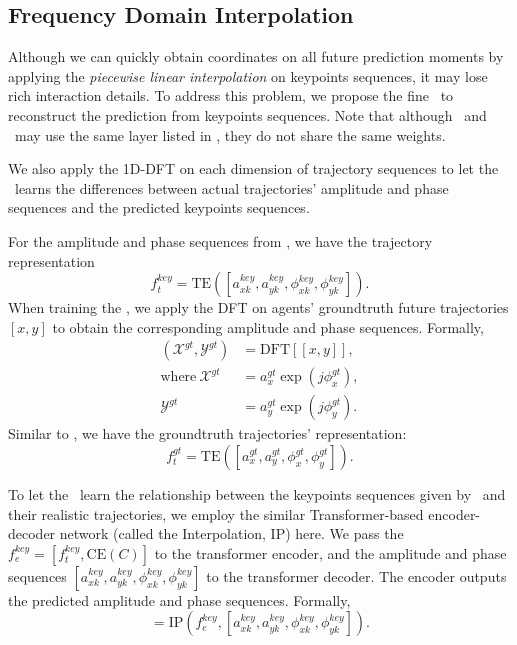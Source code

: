 \documentclass[../paper.tex]{subfiles}
\begin{document}
\subsection{Frequency Domain Interpolation}

Although we can quickly obtain coordinates on all future prediction moments by applying the \emph{piecewise linear interpolation} on keypoints sequences, it may lose rich interaction details.
To address this problem, we propose the fine \BETAMODEL~to reconstruct the prediction from keypoints sequences.
Note that although \ALPHAMODEL~and \BETAMODEL~may use the same layer listed in , they do not share the same weights.

We also apply the 1D-DFT on each dimension of trajectory sequences to let the \BETAMODEL~learns the differences between actual trajectories' amplitude and phase sequences and the predicted keypoints sequences.

For the amplitude and phase sequences from , we have
the trajectory representation
\begin{equation}
    \label{eq_keydft}
    f^{key}_t = \mbox{TE}([a_{xk}^{key}, a_{yk}^{key}, \phi_{xk}^{key}, \phi_{yk}^{key}]).
\end{equation}
When training the \BETAMODEL, we apply the DFT on agents' groundtruth future trajectories $[x, y]$ to obtain the corresponding amplitude and phase sequences.
Formally,
\begin{equation}
    \begin{aligned}
        (\mathcal{X}^{gt}, \mathcal{Y}^{gt}) &= \mbox{DFT}[[x, y]], \\
        \mbox{where}~\mathcal{X}^{gt} &= a_{x}^{gt} \exp (j\phi_{x}^{gt}), \\
        \mathcal{Y}^{gt} &= a_{y}^{gt} \exp (j\phi_{y}^{gt}).
    \end{aligned}
\end{equation}
Similar to , we have the groundtruth trajectories' representation:
\begin{equation}
    f^{gt}_t = \mbox{TE}([a_{x}^{gt}, a_{y}^{gt}, \phi_{x}^{gt}, \phi_{y}^{gt}]).
\end{equation}

To let the \BETAMODEL~learn the relationship between the keypoints sequences given by \ALPHAMODEL~and their realistic trajectories, we employ the similar Transformer-based encoder-decoder network (called the Interpolation, IP) here.
We pass the $f_e^{key} = [f_t^{key}, \mbox{CE}(C)]$ to the transformer encoder, and the amplitude and phase sequences $[a_{xk}^{key}, a_{yk}^{key}, \phi_{xk}^{key}, \phi_{yk}^{key}]$ to the transformer decoder.
The encoder outputs the predicted amplitude and phase sequences.
Formally,
\begin{equation}
    [\hat{a}_x, \hat{a}_y, \hat{\phi}_x, \hat{\phi}_y] = \mbox{IP}(f_e^{key}, [a_{xk}^{key}, a_{yk}^{key}, \phi_{xk}^{key}, \phi_{yk}^{key}]).
\end{equation}
\end{document}
